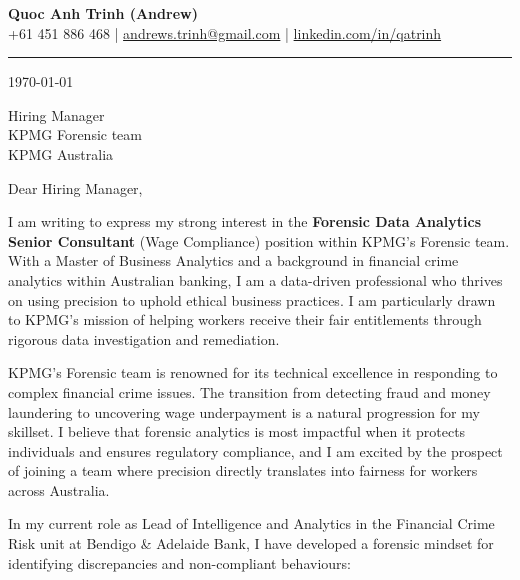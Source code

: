 \documentclass[11pt, a4paper]{article}
\begin{document}
\begin{center}
    {\LARGE \textbf{Quoc Anh Trinh (Andrew)}}\\[4pt]
    {\small
        +61 451 886 468 \quad|\quad
        \href{mailto:andrews.trinh@gmail.com}{andrews.trinh@gmail.com} \quad|\quad
        \href{https://www.linkedin.com/in/qatrinh}{linkedin.com/in/qatrinh}
    }
\end{center}

\vspace{4pt}
\hrule
\vspace{14pt}

\today

\vspace{8pt}

Hiring Manager\\
KPMG Forensic team\\
KPMG Australia

\vspace{10pt}

Dear Hiring Manager,

I am writing to express my strong interest in the \textbf{Forensic Data Analytics Senior Consultant} (Wage Compliance) position within KPMG’s Forensic team. With a Master of Business Analytics and a background in financial crime analytics within Australian banking, I am a data-driven professional who thrives on using precision to uphold ethical business practices. I am particularly drawn to KPMG’s mission of helping workers receive their fair entitlements through rigorous data investigation and remediation.

KPMG’s Forensic team is renowned for its technical excellence in responding to complex financial crime issues. The transition from detecting fraud and money laundering to uncovering wage underpayment is a natural progression for my skillset. I believe that forensic analytics is most impactful when it protects individuals and ensures regulatory compliance, and I am excited by the prospect of joining a team where precision directly translates into fairness for workers across Australia.

In my current role as Lead of Intelligence and Analytics in the Financial Crime Risk unit at Bendigo \& Adelaide Bank, I have developed a forensic mindset for identifying discrepancies and non-compliant behaviours:
\end{document}
